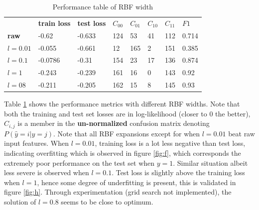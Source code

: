 \documentclass[journal]{IEEEtran}
\begin{document}
\begin{table}[htbp]
\begin{tabular}{llllllll}
                  & \textbf{train loss} & \textbf{test loss} & \textbf{$C_{00}$} & \textbf{$C_{01}$} & \textbf{$C_{10}$} & \textbf{$C_{11}$} & \textbf{$F1$} \\ \cline{2-8} 
\textbf{raw}      & -0.62               & -0.633             & 124               & 53                & 41                & 112               & 0.714         \\
\textbf{$l=0.01$} & -0.055              & -0.661             & 12                & 165               & 2                 & 151               & 0.385         \\
\textbf{$l=0.1$}  & -0.0786             & -0.31              & 154               & 23                & 17                & 136               & 0.874         \\
\textbf{$l=1$}    & -0.243              & -0.239             & 161               & 16                & 0                 & 143               & 0.92          \\
\textbf{$l=08$}   & -0.211              & -0.205             & 162               & 15                & 8                 & 145               & 0.93         
\end{tabular}
\caption{Performance table of RBF width}
\label{tab:rbf}
\end{table}
Table \ref{tab:rbf} shows the performance metrics with different RBF widths. Note that both the training and test set losses are in log-likelihood (closer to 0 the better), $C_{i,j}$ is a member in the \textbf{un-normalized} confusion matrix denoting $P(\hat{y}=i|y=j)$. Note that all RBF expansions except for when $l=0.01$ beat raw input features. When $l=0.01$, training loss is a lot less negative than test loss, indicating overfitting which is observed in figure \ref{fig:f}, which corresponds the extremely poor performance on the test set when $y=1$. Similar situation albeit less severe is observed when $l=0.1$. Test loss is slightly above the training loss when $l=1$, hence some degree of underfitting is present, this is validated in figure \ref{fig:h}. Through experimentation (grid search not implemented), the solution of $l=0.8$ seems to be close to optimum.
\end{document}
